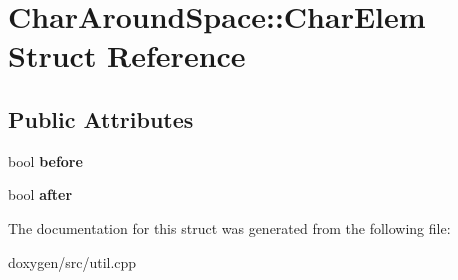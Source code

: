 \hypertarget{struct_char_around_space_1_1_char_elem}{}\section{Char\+Around\+Space\+::Char\+Elem Struct Reference}
\label{struct_char_around_space_1_1_char_elem}
\subsection*{Public Attributes}
\begin{DoxyCompactItemize}
\item 
\mbox{\label{struct_char_around_space_1_1_char_elem_a2cc8bd46084123643712f05b34127f0c}} 
bool {\bfseries before}
\item 
\mbox{\label{struct_char_around_space_1_1_char_elem_a7d441df386dc9a623e1fceb6ecee09ca}} 
bool {\bfseries after}
\end{DoxyCompactItemize}


The documentation for this struct was generated from the following file\+:\begin{DoxyCompactItemize}
\item 
doxygen/src/util.\+cpp\end{DoxyCompactItemize}
